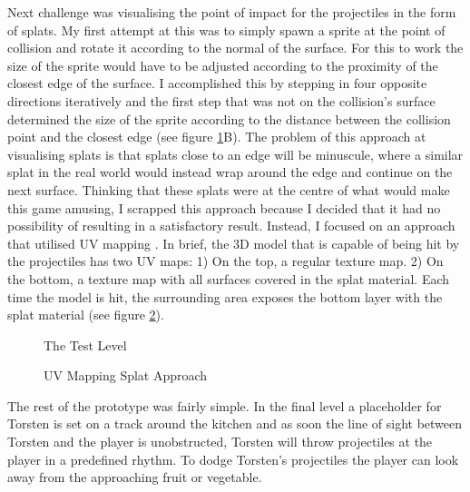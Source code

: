 Next challenge was visualising the point of impact for the projectiles in the form of splats. My first attempt at this was to simply spawn a sprite at the point of collision and rotate it according to the normal of the surface. For this to work the size of the sprite would have to be adjusted according to the proximity of the closest edge of the surface. I accomplished this by stepping in four opposite directions iteratively and the first step that was not on the collision's surface determined the size of the sprite according to the distance between the collision point and the closest edge (see figure \ref{TestScene}B). The problem of this approach at visualising splats is that splats close to an edge will be minuscule, where a similar splat in the real world would instead wrap around the edge and continue on the next surface. Thinking that these splats were at the centre of what would make this game amusing, I scrapped this approach because I decided that it had no possibility of resulting in a satisfactory result. Instead, I focused on an approach that utilised UV mapping \cite{mullen}. In brief, the 3D model that is capable of being hit by the projectiles has two UV maps: 1) On the top, a regular texture map. 2) On the bottom, a texture map with all surfaces covered in the splat material. Each time the model is hit, the surrounding area exposes the bottom layer with the splat material (see figure \ref{UVSplat}).
\begin{center}
  \begin{figure}[!htb]
    \noindent{}
    \caption{The Test Level}
    \label{TestScene}
  \end{figure}
\end{center}
\begin{center}
  \begin{figure}[!htb]
    \noindent{}
    \caption{UV Mapping Splat Approach}
    \label{UVSplat}
  \end{figure}
\end{center}
The rest of the prototype was fairly simple. In the final level a placeholder for Torsten is set on a track around the kitchen and as soon the line of sight between Torsten and the player is unobstructed, Torsten will throw projectiles at the player in a predefined rhythm. To dodge Torsten's projectiles the player can look away from the approaching fruit or vegetable.
